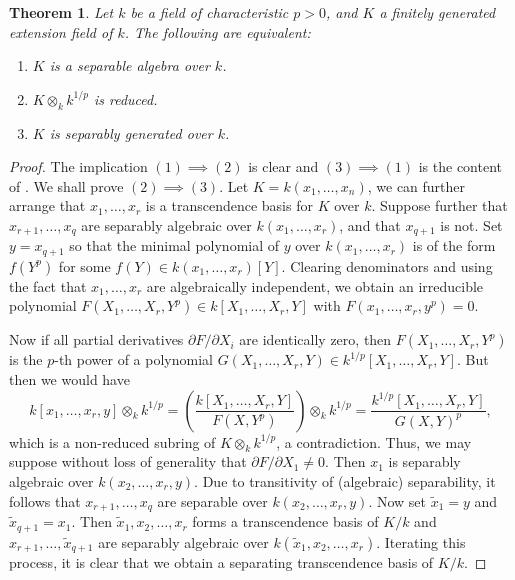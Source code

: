 \documentclass[10pt]{article}
\theoremstyle{thmstyle}
\newtheorem{theorem}{Theorem}[section]
\theoremstyle{defstyle}
\newcommand{\wt}[1]{\widetilde{#1}}
\begin{document}
\begin{theorem}
    Let $k$ be a field of characteristic $p > 0$, and $K$ a finitely generated extension field of $k$. The following are equivalent: 
    \begin{enumerate}[label=(\arabic*)]
        \item $K$ is a separable algebra over $k$. 
        \item $K\otimes_k k^{1/p}$ is reduced. 
        \item $K$ is separably generated over $k$.
    \end{enumerate}
\end{theorem}
\begin{proof}
    The implication $(1)\implies(2)$ is clear and $(3)\implies(1)$ is the content of . We shall prove $(2)\implies(3)$. Let $K = k(x_1,\dots,x_n)$, we can further arrange that $x_1,\dots,x_r$ is a transcendence basis for $K$ over $k$. Suppose further that $x_{r + 1},\dots,x_q$ are separably algebraic over $k(x_1,\dots,x_r)$, and that $x_{q + 1}$ is not. Set $y = x_{q + 1}$ so that the minimal polynomial of $y$ over $k(x_1,\dots,x_r)$ is of the form $f(Y^p)$ for some $f(Y)\in k(x_1,\dots,x_r)[Y]$. Clearing denominators and using the fact that $x_1,\dots,x_r$ are algebraically independent, we obtain an irreducible polynomial $F(X_1,\dots,X_r, Y^p)\in k[X_1,\dots,X_r, Y]$ with $F(x_1,\dots,x_r, y^p) = 0$.

    Now if all partial derivatives $\partial F/\partial X_i$ are identically zero, then $F(X_1,\dots,X_r, Y^p)$ is the $p$-th power of a polynomial $G(X_1,\dots,X_r, Y)\in k^{1/p}[X_1,\dots,X_r, Y]$. But then we would have 
    \begin{equation*}
        k[x_1,\dots,x_r, y]\otimes_k k^{1/p} = \left(\frac{k[X_1,\dots,X_r,Y]}{F(X, Y^p)}\right)\otimes_k k^{1/p} = \frac{k^{1/p}[X_1,\dots,X_r, Y]}{G(X, Y)^p},
    \end{equation*}
    which is a non-reduced subring of $K\otimes_k k^{1/p}$, a contradiction. Thus, we may suppose without loss of generality that $\partial F/\partial X_1\ne 0$. Then $x_1$ is separably algebraic over $k(x_2,\dots,x_r, y)$. Due to transitivity of (algebraic) separability, it follows that $x_{r + 1},\dots,x_q$ are separable over $k(x_2,\dots,x_r, y)$. Now set $\wt x_1 = y$ and $\wt x_{q + 1} = x_1$. Then $\wt x_1,x_2,\dots,x_r$ forms a transcendence basis of $K/k$ and $x_{r + 1},\dots,\wt x_{q + 1}$ are separably algebraic over $k(\wt x_1,x_2,\dots,x_r)$. Iterating this process, it is clear that we obtain a separating transcendence basis of $K/k$.
\end{proof}
\end{document}
